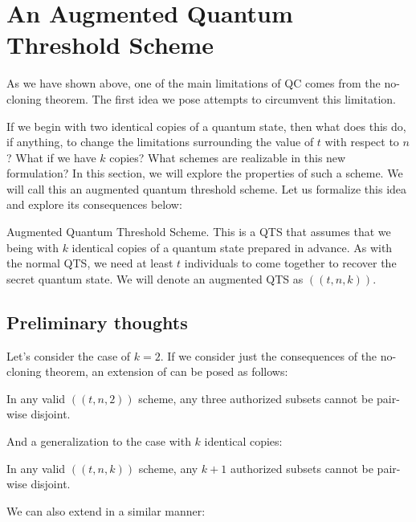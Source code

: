 \chapter{An Augmented Quantum Threshold Scheme}
\label{ch3}

As we have shown above, one of the main limitations of QC comes from the no-cloning theorem. The first idea we pose attempts to circumvent this limitation. 

If we begin with two identical copies of a quantum state, then what does this do, if anything, to change the limitations surrounding the value of $t$ with respect to $n$? What if we have $k$ copies? What schemes are realizable in this new formulation? In this section, we will explore the properties of such a scheme. We will call this an augmented quantum threshold scheme. Let us formalize this idea and explore its consequences below:

\theoremstyle{definition}
\begin{definition}{Augmented Quantum Threshold Scheme.}
    \label{defn:augmented-qts}
     This is a QTS that assumes that we being with $k$ identical copies of a quantum state prepared in advance. As with the normal QTS, we need at least $t$ individuals to come together to recover the secret quantum state. We will denote an augmented QTS as $((t,n,k))$.
\end{definition}

\section{Preliminary thoughts}

Let's consider the case of $k=2$. If we consider just the consequences of the no-cloning theorem, an extension of  can be posed as follows:

\begin{theorem}
    \label{thm:three-authorized}
    In any valid $((t,n,2))$ scheme, any three authorized subsets cannot be pair-wise disjoint.
\end{theorem}

And a generalization to the case with $k$ identical copies:

\begin{theorem}
    \label{thm:k-authorized}
    In any valid $((t,n,k))$ scheme, any $k+1$ authorized subsets cannot be pair-wise disjoint.
\end{theorem}

We can also extend  in a similar manner:

